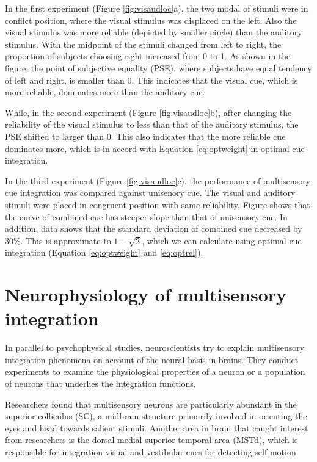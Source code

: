 \documentclass{article}[11pt]
\begin{document}
In the first experiment (Figure \ref{fig:visaudloc}a), the two modal of stimuli were in conflict position, where the visual stimulus was displaced on the left. Also the visual stimulus was more reliable (depicted by smaller circle) than the auditory stimulus. With the midpoint of the stimuli changed from left to right, the proportion of subjects choosing right increased from 0 to 1. As shown in the figure, the point of subjective equality (PSE), where subjects have equal tendency of left and right, is smaller than 0. This indicates that the visual cue, which is more reliable, dominates more than the auditory cue.

While, in the second experiment (Figure \ref{fig:visaudloc}b), after changing the reliability of the visual stimulus to less than that of the auditory stimulus, the PSE shifted to larger than 0. This also indicates that the more reliable cue dominates more, which is in accord with Equation \ref{eq:optweight} in optimal cue integration.

In the third experiment (Figure \ref{fig:visaudloc}c), the performance of multisensory cue integration was compared against unisenory cue. The visual and auditory stimuli were placed in congruent position with same reliability. Figure shows that the curve of combined cue has steeper slope than that of unisensory cue. In addition, data shows that the standard deviation of combined cue decreased by $30\%$. This is approximate to $1-\sqrt{2}$, which we can calculate using optimal cue integration (Equation \ref{eq:optweight} and \ref{eq:optrel}).

\section{Neurophysiology of multisensory integration}
In parallel to psychophysical studies, neuroscientists try to explain multisensory integration phenomena on account of the neural basis in brains.
They conduct experiments to examine the physiological properties of a neuron or a population of neurons that underlies the integration functions.

Researchers found that multisensory neurons are particularly abundant in the superior colliculus (SC), a midbrain structure primarily involved in orienting the eyes and head towards salient stimuli\cite{sparks_translation_1986}. Another area in brain that caught interest from researchers is the dorsal medial superior temporal area (MSTd), which is responsible for integration visual and vestibular cues for detecting self-motion\cite{gu_visual_2006}.
\end{document}
